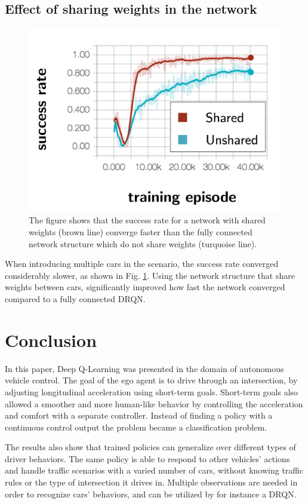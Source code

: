 \subsection{Effect of sharing weights in the network}
\begin{figure}[!h]
	\centering
	\includegraphics[width=0.8\columnwidth]{figures/results_shared.png}
	\caption{The figure shows that the success rate for a network with shared weights (brown line) converge faster than the fully connected network structure which do not share weights (turquoise line).}
	\label{fig:results_shared}
\end{figure}
When introducing multiple cars in the scenario, the success rate converged considerably slower, as shown in Fig. \ref{fig:results_shared}. Using the network structure that share weights between cars, significantly improved how fast the network converged compared to a fully connected DRQN. 

\section{Conclusion}
\label{sec:conclusion}
In this paper, Deep Q-Learning was presented in the domain of autonomous vehicle control. The goal of the ego agent is to drive through an intersection, by adjusting longitudinal acceleration using short-term goals. Short-term goals also allowed a smoother and more human-like behavior by controlling the acceleration and comfort with a separate controller. Instead of finding a policy with a continuous control output the problem became a classification problem. 

The results also show that trained policies can generalize over different types of driver behaviors. The same policy is able to respond to other vehicles' actions and handle traffic scenarios with a varied number of cars, without knowing traffic rules or the type of intersection it drives in. Multiple observations are needed in order to recognize cars' behaviors, and can be utilized by for instance a DRQN. 

